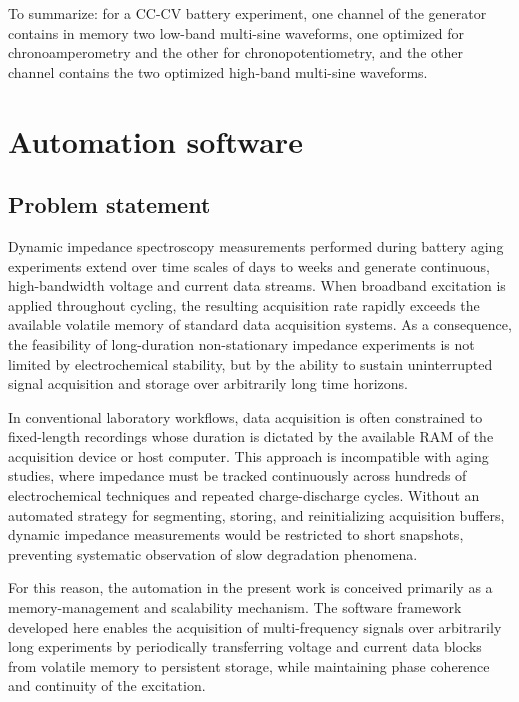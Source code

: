 To summarize: for a CC-CV battery experiment, one channel of the generator contains in memory two low-band multi-sine waveforms, one optimized for chronoamperometry and the other for chronopotentiometry, and the other channel contains the two optimized high-band multi-sine waveforms.

\section{Automation software}
\label{sec:software}

\subsection{Problem statement}
Dynamic impedance spectroscopy measurements performed during battery aging experiments extend over time scales of days to weeks and generate continuous, high-bandwidth voltage and current data streams. When broadband excitation is applied throughout cycling, the resulting acquisition rate rapidly exceeds the available volatile memory of standard data acquisition systems. As a consequence, the feasibility of long-duration non-stationary impedance experiments is not limited by electrochemical stability, but by the ability to sustain uninterrupted signal acquisition and storage over arbitrarily long time horizons.

In conventional laboratory workflows, data acquisition is often constrained to fixed-length recordings whose duration is dictated by the available RAM of the acquisition device or host computer. This approach is incompatible with aging studies, where impedance must be tracked continuously across hundreds of electrochemical techniques and repeated charge-discharge cycles. Without an automated strategy for segmenting, storing, and reinitializing acquisition buffers, dynamic impedance measurements would be restricted to short snapshots, preventing systematic observation of slow degradation phenomena.

For this reason, the automation in the present work is conceived primarily as a memory-management and scalability mechanism. The software framework developed here enables the acquisition of multi-frequency signals over arbitrarily long experiments by periodically transferring voltage and current data blocks from volatile memory to persistent storage, while maintaining phase coherence and continuity of the excitation. 

